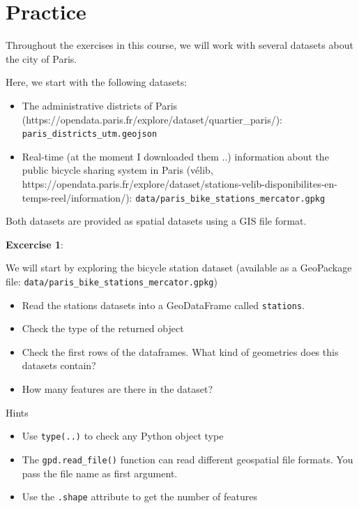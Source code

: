 \documentclass[
  letterpaper,
  DIV=11,
  numbers=noendperiod]{scrreprt}
\providecommand{\tightlist}{%
  \setlength{\itemsep}{0pt}\setlength{\parskip}{0pt}}\usepackage{longtable,booktabs,array}
\begin{document}

\chapter{Practice}\label{practice}

Throughout the exercises in this course, we will work with several
datasets about the city of Paris.

Here, we start with the following datasets:

\begin{itemize}
\tightlist
\item
  The administrative districts of Paris
  (https://opendata.paris.fr/explore/dataset/quartier\_paris/):
  \texttt{paris\_districts\_utm.geojson}
\item
  Real-time (at the moment I downloaded them ..) information about the
  public bicycle sharing system in Paris (vélib,
  https://opendata.paris.fr/explore/dataset/stations-velib-disponibilites-en-temps-reel/information/):
  \texttt{data/paris\_bike\_stations\_mercator.gpkg}
\end{itemize}

Both datasets are provided as spatial datasets using a GIS file format.

\textbf{Excercise 1}:

We will start by exploring the bicycle station dataset (available as a
GeoPackage file: \texttt{data/paris\_bike\_stations\_mercator.gpkg})

\begin{itemize}
\tightlist
\item
  Read the stations datasets into a GeoDataFrame called
  \texttt{stations}.
\item
  Check the type of the returned object
\item
  Check the first rows of the dataframes. What kind of geometries does
  this datasets contain?
\item
  How many features are there in the dataset?
\end{itemize}

Hints

\begin{itemize}
\tightlist
\item
  Use \texttt{type(..)} to check any Python object type
\item
  The \texttt{gpd.read\_file()} function can read different geospatial
  file formats. You pass the file name as first argument.
\item
  Use the \texttt{.shape} attribute to get the number of features
\end{itemize}
\end{document}
